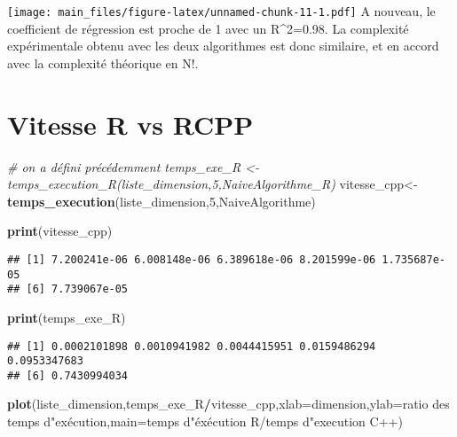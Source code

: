 \documentclass[
]{article}
\newenvironment{Shaded}{\begin{snugshade}}{\end{snugshade}}
\newcommand{\AttributeTok}[1]{\textcolor[rgb]{0.13,0.29,0.53}{#1}}
\newcommand{\CommentTok}[1]{\textcolor[rgb]{0.56,0.35,0.01}{\textit{#1}}}
\newcommand{\DecValTok}[1]{\textcolor[rgb]{0.00,0.00,0.81}{#1}}
\newcommand{\FunctionTok}[1]{\textcolor[rgb]{0.13,0.29,0.53}{\textbf{#1}}}
\newcommand{\NormalTok}[1]{#1}
\newcommand{\OtherTok}[1]{\textcolor[rgb]{0.56,0.35,0.01}{#1}}
\newcommand{\SpecialCharTok}[1]{\textcolor[rgb]{0.81,0.36,0.00}{\textbf{#1}}}
\newcommand{\StringTok}[1]{\textcolor[rgb]{0.31,0.60,0.02}{#1}}
\begin{document}
\texttt{[image: main\_files/figure-latex/unnamed-chunk-11-1.pdf]} A
nouveau, le coefficient de régression est proche de 1 avec un
R\^{}2=0.98. La complexité expérimentale obtenu avec les deux
algorithmes est donc similaire, et en accord avec la complexité
théorique en N!.

\hypertarget{vitesse-r-vs-rcpp}{%
\section{Vitesse R vs RCPP}\label{vitesse-r-vs-rcpp}}

\begin{Shaded}
\begin{Highlighting}[]
\CommentTok{\# on a défini précédemment temps\_exe\_R \textless{}{-} temps\_execution\_R(liste\_dimension,5,NaiveAlgorithme\_R)}
\NormalTok{vitesse\_cpp}\OtherTok{\textless{}{-}}\FunctionTok{temps\_execution}\NormalTok{(liste\_dimension,}\DecValTok{5}\NormalTok{,NaiveAlgorithme)}

\FunctionTok{print}\NormalTok{(vitesse\_cpp)}
\end{Highlighting}
\end{Shaded}

\begin{verbatim}
## [1] 7.200241e-06 6.008148e-06 6.389618e-06 8.201599e-06 1.735687e-05
## [6] 7.739067e-05
\end{verbatim}

\begin{Shaded}
\begin{Highlighting}[]
\FunctionTok{print}\NormalTok{(temps\_exe\_R)}
\end{Highlighting}
\end{Shaded}

\begin{verbatim}
## [1] 0.0002101898 0.0010941982 0.0044415951 0.0159486294 0.0953347683
## [6] 0.7430994034
\end{verbatim}

\begin{Shaded}
\begin{Highlighting}[]
\FunctionTok{plot}\NormalTok{(liste\_dimension,temps\_exe\_R}\SpecialCharTok{/}\NormalTok{vitesse\_cpp,}\AttributeTok{xlab=}\StringTok{\textquotesingle{}dimension\textquotesingle{}}\NormalTok{,}\AttributeTok{ylab=}\StringTok{\textquotesingle{}ratio des temps d"exécution\textquotesingle{}}\NormalTok{,}\AttributeTok{main=}\StringTok{\textquotesingle{}temps d"éxécution R/temps d"execution C++\textquotesingle{}}\NormalTok{)}
\end{Highlighting}
\end{Shaded}
\end{document}
